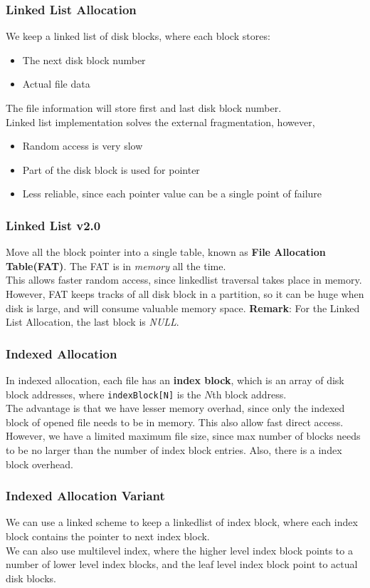 \documentclass[12pt]{article}
\theoremstyle{definition}
\begin{document}
\subsubsection{Linked List Allocation}
We keep a linked list of disk blocks, where each block stores:
\begin{itemize}
  \item The next disk block number
  \item Actual file data
\end{itemize}
The file information will store first and last disk block number.\\
Linked list implementation solves the external fragmentation, however,
\begin{itemize}
  \item Random access is very slow
  \item Part of the disk block is used for pointer
  \item Less reliable, since each pointer value can be a single point of failure
\end{itemize}
\subsubsection{Linked List v2.0}
Move all the block pointer into a single table, known as \textbf{File Allocation Table(FAT)}. The FAT is in \textit{memory} all the time.\\
This allows faster random access, since linkedlist traversal takes place in memory.\\
However, FAT keeps tracks of all disk block in a partition, so it can be huge when disk is large, and will consume valuable memory space.
\textbf{Remark}: For the Linked List Allocation, the last block is \textit{NULL}.
\subsubsection{Indexed Allocation}
In indexed allocation, each file has an \textbf{index block}, which is an array of disk block addresses, where \texttt{indexBlock[N]} is the $N$th block address.\\
The advantage is that we have lesser memory overhad, since only the indexed block of opened file needs to be in memory. This also allow fast direct access.\\
However, we have a limited maximum file size, since max number of blocks needs to be no larger than the number of index block entries. Also, there is a index block overhead.
\subsubsection{Indexed Allocation Variant}
We can use a linked scheme to keep a linkedlist of index block, where each index block contains the pointer to next index block.\\
We can also use multilevel index, where the higher level index block points to a number of lower level index blocks, and the leaf level index block point to actual disk blocks.
\end{document}

